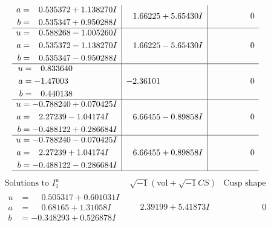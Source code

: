 \documentclass[1p]{elsarticle_modified}
\theoremstyle{definition}
\newcommand{\I}{\sqrt{-1}}
\begin{document}
$$\begin{array}{c|c|c}
\begin{aligned}
a &= \phantom{-}0.535372 + 1.138270 I \\
b &= \phantom{-}0.535347 + 0.950288 I\end{aligned}
 & \phantom{-}1.66225 + 5.65430 I & \phantom{-0.000000 } 0 \\ \hline\begin{aligned}
u &= \phantom{-}0.588268 - 1.005260 I \\
a &= \phantom{-}0.535372 - 1.138270 I \\
b &= \phantom{-}0.535347 - 0.950288 I\end{aligned}
 & \phantom{-}1.66225 - 5.65430 I & \phantom{-0.000000 } 0 \\ \hline\begin{aligned}
u &= \phantom{-}0.833640\phantom{ +0.000000I} \\
a &= -1.47003\phantom{ +0.000000I} \\
b &= \phantom{-}0.440138\phantom{ +0.000000I}\end{aligned}
 & -2.36101\phantom{ +0.000000I} & \phantom{-0.000000 } 0 \\ \hline\begin{aligned}
u &= -0.788240 + 0.070425 I \\
a &= \phantom{-}2.27239 - 1.04174 I \\
b &= -0.488122 + 0.286684 I\end{aligned}
 & \phantom{-}6.66455 - 0.89858 I & \phantom{-0.000000 } 0 \\ \hline\begin{aligned}
u &= -0.788240 - 0.070425 I \\
a &= \phantom{-}2.27239 + 1.04174 I \\
b &= -0.488122 - 0.286684 I\end{aligned}
 & \phantom{-}6.66455 + 0.89858 I & \phantom{-0.000000 } 0\\
 \hline 
 \end{array}$$\newpage$$\begin{array}{c|c|c}  
\text{Solutions to }I^u_{1}& \I (\text{vol} + \sqrt{-1}CS) & \text{Cusp shape}\\
 \hline 
\begin{aligned}
u &= \phantom{-}0.505317 + 0.601031 I \\
a &= \phantom{-}0.68165 + 1.31058 I \\
b &= -0.348293 + 0.526878 I\end{aligned}
 & \phantom{-}2.39199 + 5.41873 I & \phantom{-0.000000 } 0 \\ \hline\begin{aligned}

\end{aligned}
\end{array}$$
\end{document}

